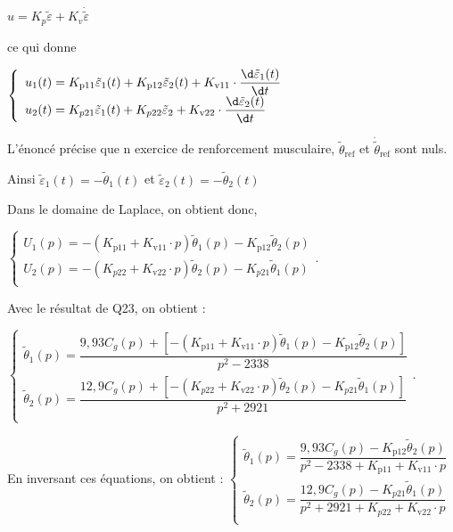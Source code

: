 \ifprof\begin{corrige}

$u=K_p\tilde{\varepsilon}+K_v\dot{\tilde{\varepsilon}}$

ce qui donne 

$
\left\{
\begin{array}{l}
u_1(t)=K_{\text{p11}}\tilde{\varepsilon}_1(t)+K_{\text{p12}}\tilde{\varepsilon}_2(t)+K_{\text{v11}} \cdot \dfrac{\d \tilde{\varepsilon}_1(t)}{\d t} \\
u_2(t)=K_{p21}\tilde{\varepsilon}_1(t)+K_{p22}\tilde{\varepsilon}_2+K_{\text{v22}}\cdot \dfrac{\d \tilde{\varepsilon}_2(t)}{\d t}
\end{array}
\right.
$

L'énoncé précise que n exercice de renforcement musculaire, $\tilde{\theta}_{\text{ref}}$ et $\dot{\tilde{\theta}}_{\text{ref}}$ sont nuls.

Ainsi $\tilde{\varepsilon}_1(t)=-\tilde{\theta}_1(t)$ et $\tilde{\varepsilon}_2(t)=-\tilde{\theta}_2(t)$

Dans le domaine de Laplace, on obtient donc,

$
\left\{
\begin{array}{l}
U_1(p)=-\left(K_{\text{p11}}+K_{\text{v11}}\cdot p\right)\tilde{\theta}_1(p)-K_{\text{p12}}\tilde{\theta}_2(p)\\
U_2(p)=-\left(K_{p22}+K_{\text{v22}}\cdot p\right)\tilde{\theta}_2(p)-K_{p21}\tilde{\theta}_1(p)\\
\end{array}
\right.
$.

Avec le résultat de Q23, on obtient : 

$
\left\{
\begin{array}{l}
\tilde{\theta}_1(p)=\dfrac{9,93C_g(p)+\left[-\left(K_{\text{p11}}+K_{\text{v11}}\cdot p\right)\tilde{\theta}_1(p)-K_{\text{p12}}\tilde{\theta}_2(p)\right]}{p^2-2338}\\
\tilde{\theta}_2(p)=\dfrac{12,9C_g(p)+\left[-\left(K_{p22}+K_{\text{v22}}\cdot p\right)\tilde{\theta}_2(p)-K_{p21}\tilde{\theta}_1(p)\right]}{p^2+2921}\\
\end{array}
\right.
$.

En inversant ces équations, on obtient : 
$
\left\{
\begin{array}{l}
\tilde{\theta}_1(p)=\dfrac{9,93C_g(p)-K_{\text{p12}}\tilde{\theta}_2(p)}{p^2-2338+K_{\text{p11}}+K_{\text{v11}}\cdot p}\\
\tilde{\theta}_2(p)=\dfrac{12,9C_g(p)-K_{p21}\tilde{\theta}_1(p)}{p^2+2921+K_{p22}+K_{\text{v22}}\cdot p}\\
\end{array}
\right.
$

\end{corrige}\else\fi


